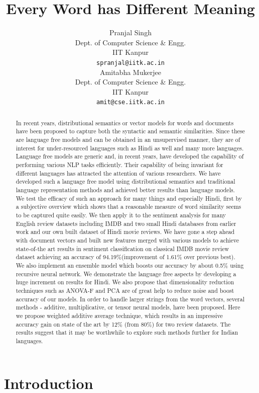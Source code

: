 \documentclass[11pt,a4paper]{article}
\title{Every Word has Different Meaning}
\author{Pranjal Singh \\
  Dept. of Computer Science \& Engg. \\
  IIT Kanpur \\
  {\tt spranjal@iitk.ac.in} \\\And
  Amitabha Mukerjee \\
  Dept. of Computer Science \& Engg. \\
  IIT Kanpur \\
  {\tt amit@cse.iitk.ac.in} \\}
\date{}
\begin{document}
\maketitle
\begin{abstract}
In recent years, distributional semantics or vector models for words and documents have been proposed to capture both the syntactic and semantic similarities. Since these are language free models and can be obtained in an unsupervised manner, they are of interest for under-resourced languages such as Hindi as well and many more languages. 
Language free models are generic and, in recent years, have developed the capability of performing various NLP tasks efficiently. Their capability of being invariant for different languages has attracted the attention of various researchers. We have developed such a language free model using distributional semantics and traditional language representation methods and achieved better results than language models.
We test the efficacy of such an approach for many things and especially Hindi, first by a subjective overview which shows that a reasonable measure of word similarity seems to be captured quite easily.  We then apply it to the sentiment analysis for many English review datasets including IMDB and two small Hindi databases from earlier work and our own built dataset of Hindi movie reviews. 
We have gone a step ahead with document vectors and built new features merged with various models to achieve state-of-the art results in sentiment classification on classical IMDB movie review dataset achieving an accuracy of 94.19\%(improvement of 1.61\% over previous best). We also implement an ensemble model which boosts our accuracy by about 0.5\% using recursive neural network.
We demonstrate the language free aspects by developing a huge increment on results for Hindi. We also propose that dimensionality reduction techniques such as ANOVA-F and PCA are of great help to reduce noise and boost accuracy of our models.
In order to handle larger strings from the word vectors, several methods - additive, multiplicative, or tensor neural models, have been proposed.  Here we propose weighted additive average technique, which results in an impressive accuracy gain on state of the art by 12\% (from 80\%) for two review datasets.  The results suggest that it may be worthwhile to explore such methods further for Indian languages.
\end{abstract}


\section{Introduction}
\end{document}
